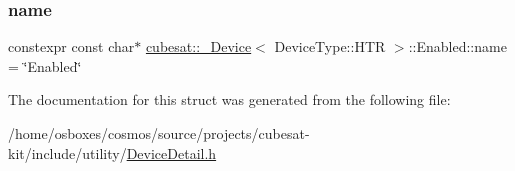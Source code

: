 \subsubsection{\texorpdfstring{name}{name}}
{\footnotesize\ttfamily constexpr const char$\ast$ \hyperlink{structcubesat_1_1__Device}{cubesat\+::\+\_\+\+Device}$<$ Device\+Type\+::\+H\+TR $>$\+::Enabled\+::name = \char`\"{}Enabled\char`\"{}\hspace{0.3cm}{\ttfamily [static]}}



The documentation for this struct was generated from the following file\+:\begin{DoxyCompactItemize}
\item 
/home/osboxes/cosmos/source/projects/cubesat-\/kit/include/utility/\hyperlink{DeviceDetail_8h}{Device\+Detail.\+h}\end{DoxyCompactItemize}
